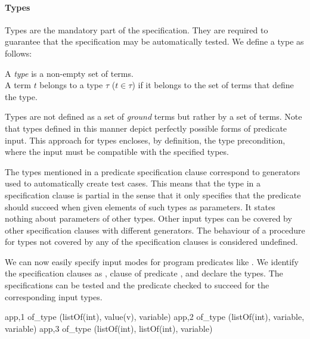 \paragraph{\bf Types}

Types are the mandatory part of the specification.
%
They are required to guarantee that the specification may be
automatically tested.
%
We define a type as follows: 
%
\begin{definition}
\label{def:type}
A {\em type} is a non-empty set of terms.\\
A term $t$ belongs to a type $\tau$ ($t \in \tau$) if it belongs to the set of
terms that define the type.
\end{definition}


Types are not defined as a set of \emph{ground} terms but rather by
a set of terms.
%
%
Note that types defined in this manner depict perfectly possible forms of
predicate input.
%
This approach for types %
encloses, by definition, the type
precondition, where the input must be compatible with the specified types.


The types mentioned in a predicate specification clause correspond to \plqc{}
generators used to automatically create %
test cases.
%
This means that the type in a specification clause is partial in the
sense that it only specifies that the predicate should succeed when given
elements of such types as parameters.
%
It states nothing about parameters of other types.
%
Other input types can be covered by other specification clauses with
different generators.
%
The %
behaviour of a procedure
for types not covered by any of the
specification clauses is considered undefined.


We can now easily specify input modes for program predicates like .
%
We identify the specification clauses as , clause  of
predicate , and declare the \plqc{} types.
%
The specifications can be tested and the predicate checked to succeed
for the corresponding input types.
%
\begin{yapcode}
 {app,1} of_type (listOf(int), value(v), variable)
 {app,2} of_type (listOf(int), variable, variable)
 {app,3} of_type (listOf(int), listOf(int), variable)
\end{yapcode}


